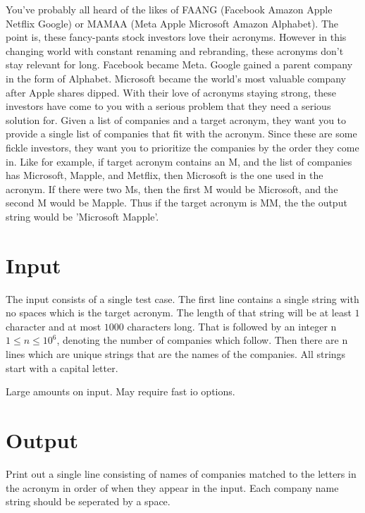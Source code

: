 
You've probably all heard of the likes of FAANG (Facebook Amazon Apple Netflix Google) or MAMAA (Meta Apple Microsoft Amazon Alphabet). The point is, these fancy-pants stock investors love their acronyms. However in this changing world with constant renaming and rebranding, these acronyms don't stay relevant for long. Facebook became Meta. Google gained a parent company in the form of Alphabet. Microsoft became the world's most valuable company after Apple shares dipped. With their love of acronyms staying strong, these investors have come to you with a serious problem that they need a serious solution for. Given a list of companies and a target acronym, they want you to provide a single list of companies that fit with the acronym. Since these are some fickle investors, they want you to prioritize the companies by the order they come in. Like for example, if target acronym contains an M, and the list of companies has Microsoft, Mapple, and Metflix, then Microsoft is the one used in the acronym. If there were two Ms, then the first M would be Microsoft, and the second M would be Mapple. Thus if the target acronym is MM, the the output string would be 'Microsoft Mapple'.

\section*{Input}

The input consists of a single test case. The first line contains a single string with no spaces which is the target acronym. The length of that string will be at least $1$ character and at most $1000$ characters long. That is followed by an integer n $1 \le n \le 10^{6}$, denoting the number of companies which follow. Then there are n lines which are unique strings that are the names of the companies. All strings start with a capital letter.

Large amounts on input. May require fast io options.

\section*{Output}

Print out a single line consisting of names of companies matched to the letters in the acronym in order of when they appear in the input. Each company name string should be seperated by a space.

